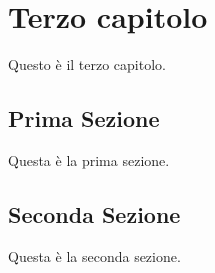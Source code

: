\clearpage{\pagestyle{empty}\cleardoublepage}
\chapter{Terzo capitolo}                %

Questo \`e il terzo capitolo.

\section{Prima Sezione}                 %
Questa \`e la prima sezione.

\section{Seconda Sezione}                 %
Questa \`e la seconda sezione.
